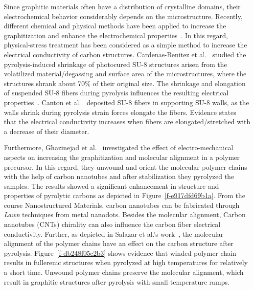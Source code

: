 \documentclass[11pt]{article}
\makeatletter
\def\fixFloatSize#1{}%
\makeatother
\begin{document}
Since graphitic materials often have a distribution of crystalline domains, their electrochemical behavior considerably depends on the microstructure. Recently, different chemical and physical methods have been applied to increase the graphitization and enhance the electrochemical properties\unskip~\cite{691550:18849438,691550:18851417,691550:18851482}. In this regard, physical-stress treatment has been considered as a simple method to increase the electrical conductivity of carbon structures. Cardenas-Benitez et al.\unskip~\cite{691550:18851643}  studied the pyrolysis-induced shrinkage of photocured SU-8 structures arisen from the volatilized material/degassing and surface area of the microstructures, where the structures shrank about 70\% of their original size. The shrinkage and elongation of suspended SU-8 fibers during pyrolysis influences the resulting electrical properties\unskip~\cite{691550:18849438}. Canton et al.\unskip~\cite{691550:18849438} deposited SU-8 fibers in supporting SU-8 walls, as the walls shrink during pyrolysis strain forces elongate the fibers. Evidence states that the electrical conductivity increases when fibers are elongated/stretched with a decrease of their diameter.


\bgroup
\fixFloatSize{images/6635ca7d-3b68-4728-94a9-cf82a38021eb-uunwindnorient.png}
\begin{figure*}[!htbp]
\centering \makeatletter{}
\makeatother 
\caption{{Unwinding polymer chains during CNT electrospinning process. $F_{ES} $ is the external electrostatic force pulling the polymer jet to the receiving plate and $F_{D} $ is the molecular drag force resisting the $F_{ES} $. Figure adapted from\unskip~\protect\cite{691550:18851819}.}}
\label{f-e917dfd69b1a}
\end{figure*}
\egroup
Furthermore, Ghazinejad et al.\unskip~\cite{691550:18851819}  investigated the effect of electro-mechanical aspects on increasing the graphitization and molecular alignment in a polymer precursor. In this regard, they unwound and orient the molecular polymer chains with the help of carbon nanotubes and after stabilization they pyrolyzed the samples. The results showed a significant enhancement in structure and properties of pyrolytic carbons as depicted in Figure~\ref{f-e917dfd69b1a}. From the course Nanostructured Materials, carbon nanotubes can be fabricated through \textit{Lawn} techniques from metal nanodots. Besides the molecular alignment, Carbon nanotubes (CNTs) chirality can also influence the carbon fiber electrical conductivity. Further, as depicted in Salazar et al.'s work\unskip~\cite{691550:18855236}, the molecular alignment of the polymer chains have an effect on the carbon structure after pyrolysis. Figure~\ref{f-db248f05c2b3} shows evidence that winded polymer chain results in fullerenic structures when pyrolyzed at high temperatures for relatively a short time. Unwound polymer chains preserve the molecular alignment, which result in graphitic structures after pyrolysis with small temperature ramps.
\end{document}
